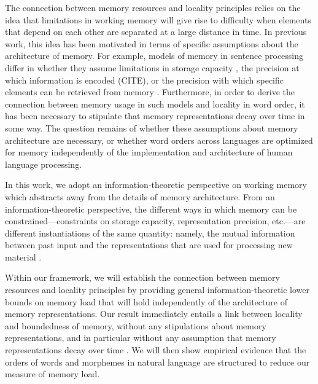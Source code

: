 The connection between memory resources and locality principles relies on the idea that limitations in working memory will give rise to difficulty when elements that depend on each other are separated at a large distance in time. In previous work, this idea has been motivated in terms of specific assumptions about the architecture of memory. For example, models of memory in sentence processing differ in whether they assume limitations in storage capacity \citep{gibson1998linguistic}, the precision at which information is encoded (CITE), or the precision with which specific elements can be retrieved from memory \citep{lewis-activation-based-2005}. Furthermore, in order to derive the connection between memory usage in such models and locality in word order, it has been necessary to stipulate that memory representations decay over time in some way. The question remains of whether these assumptions about memory architecture are necessary, or whether word orders across languages are optimized for memory independently of the implementation and architecture of human language processing.

In this work, we adopt an information-theoretic perspective on working memory which abstracts away from the details of memory architecture.
From an information-theoretic perspective, the different ways in which memory can be constrained---constraints on storage capacity, representation precision, etc.---are different instantiations of the same quantity: namely, the mutual information between past input and the representations that are used for processing new material \citep{still-information-2014}.

Within our framework, we will establish the connection between memory resources and locality principles by providing general information-theoretic lower bounds on memory load that will hold independently of the architecture of memory representations.
Our result immediately entails a link between locality and boundedness of memory, without any stipulations about memory representations, and in particular without any assumption that memory representations decay over time \citep[as was required in][]{gibson1998linguistic, lewis-activation-based-2005, futrell-noisy-context-2017}.
We will then show empirical evidence that the orders of words and morphemes in natural language are structured to reduce our measure of memory load.

